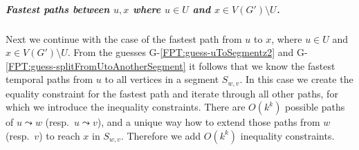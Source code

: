 \documentclass[a4paper,UKenglish,cleveref, autoref, thm-restate]{lipics-v2021}
\begin{document}
\subparagraph{\boldmath Fastest paths between $u,x$ where $u \in U$ and $x \in V(G') \setminus U$.}
Next we continue with the case of the fastest path from $u$ to $x$, where $u \in U$ and $x \in V(G') \setminus U$.
From the guesses G-\ref{FPT:guess-uToSegmentz2} and G-\ref{FPT:guess-splitFromUtoAnotherSegment} it follows that we know the fastest temporal paths from $u$ to all vertices in a segment $S_{w,v}$.
In this case we create the equality constraint for the fastest path and
iterate through all other paths, for which we introduce the inequality constraints.
There are $O(k^k)$ possible paths of $u \leadsto w$ (resp.~$u \leadsto v$),
and a unique way how to extend those paths from $w$ (resp.~$v$) to reach $x$ in $S_{w,v}$.
Therefore we add $O(k^k)$ inequality constraints.

\end{document}

